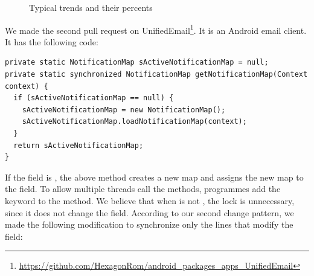 \begin{figure}
	
	\caption{Typical trends and their percents}
	\label{figure:trend}
\end{figure}
We made the second pull request on UnifiedEmail\footnote{\url{https://github.com/HexagonRom/android_packages_apps_UnifiedEmail}}. It is an Android email client. It has the following code:

\begin{lstlisting}
private static NotificationMap sActiveNotificationMap = null;
private static synchronized NotificationMap getNotificationMap(Context context) {
  if (sActiveNotificationMap == null) {
    sActiveNotificationMap = new NotificationMap();
    sActiveNotificationMap.loadNotificationMap(context);
  }
  return sActiveNotificationMap;
}
\end{lstlisting}

If the  field is , the above method creates a new map and assigns the new map to the field. To allow multiple threads call the methods, programmes add the  keyword to the method. We believe that when  is not , the lock is unnecessary, since it does not change the field. According to our second change pattern, we made the following modification to synchronize only the lines that modify the field:

